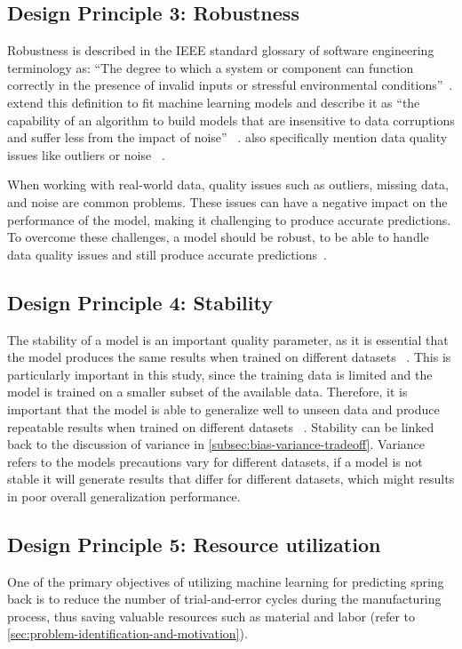 {\subsection*{Design Principle 3: Robustness}
Robustness is described in the IEEE standard glossary of software engineering terminology as:
``The degree to which a system or component can function correctly in the presence of
invalid inputs or stressful environmental conditions''~\cite[p. 64]{terminology1990ieee}.
\cite{saez2016evaluating} extend this definition to fit machine learning
models and describe it as ``the capability of an algorithm to build models that are insensitive to
data corruptions and suffer less from the impact of noise''
~\cite[p. 2]{saez_evaluatingclassifierbehavior_2016}.
\cite{siebert2022construction} also specifically mention data quality issues like
outliers or noise
~\cite[p. 16]{siebert2022construction}.

When working with real-world data, quality issues such as outliers, missing data, and
noise are common problems.
These issues can have a negative impact on the performance of the model, making it challenging to produce accurate
predictions.
To overcome these challenges, a model should be robust, to be able to handle data quality issues and still produce
accurate predictions~\cite[p. 16]{siebert2022construction}.

\subsection*{Design Principle 4: Stability}

The stability of a model is an important quality parameter, as it is essential that
the model produces the same results when trained on different datasets
~\cite[p. 16]{siebert2022construction}.
This is particularly important in this study, since the training data is limited and the model is trained on a
smaller subset of the available data.
Therefore, it is important that the model is able to generalize well to unseen data and
produce repeatable results when trained on different datasets
~\cite[p. 16]{siebert2022construction}.
Stability can be linked back to the discussion of variance in \cref{subsec:bias-variance-tradeoff}.
Variance refers to the models precautions vary for different datasets, if a model is not stable it will generate
results that differ for different datasets, which might results in poor overall generalization performance.


\subsection*{Design Principle 5: Resource utilization}\label{subsec:dp5-resource-utilization}
One of the primary objectives of utilizing machine learning for predicting spring back is to
reduce the number of trial-and-error cycles during the manufacturing process, thus saving
valuable resources such as material and labor
(refer to \cref{sec:problem-identification-and-motivation}).


}
